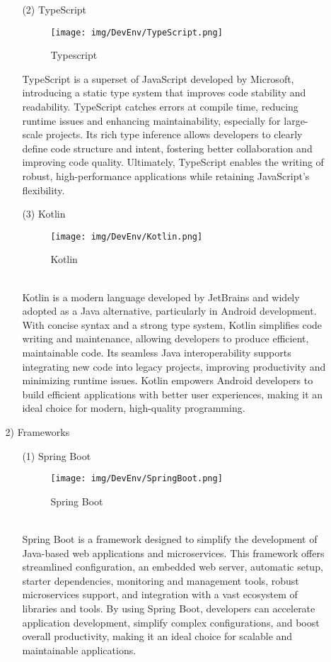 \documentclass[conference]{IEEEtran}
\begin{document}
\begin{enumerate}
\begin{itemize}
\begin{itemize}
\item [(2)] TypeScript\cite{Typescript}
\begin{figure}[h]
\centering
\texttt{[image: img/DevEnv/TypeScript.png]}
\centering
\caption{Typescript} 
\end{figure}
TypeScript is a superset of JavaScript developed by Microsoft, introducing a static type system that improves code stability and readability. TypeScript catches errors at compile time, reducing runtime issues and enhancing maintainability, especially for large-scale projects. Its rich type inference allows developers to clearly define code structure and intent, fostering better collaboration and improving code quality. Ultimately, TypeScript enables the writing of robust, high-performance applications while retaining JavaScript’s flexibility.\\

\item [(3)] Kotlin\cite{Kotlin}
\begin{figure}[h]
\centering
\texttt{[image: img/DevEnv/Kotlin.png]}\centering
\caption{Kotlin} 
\end{figure}\\
Kotlin is a modern language developed by JetBrains and widely adopted as a Java alternative, particularly in Android development. With concise syntax and a strong type system, Kotlin simplifies code writing and maintenance, allowing developers to produce efficient, maintainable code. Its seamless Java interoperability supports integrating new code into legacy projects, improving productivity and minimizing runtime issues. Kotlin empowers Android developers to build efficient applications with better user experiences, making it an ideal choice for modern, high-quality programming.\\

\end{itemize}
\item [2)] Frameworks
\begin{itemize}
\item [(1)] Spring Boot\cite{SpringBoot}
\begin{figure}[h]
\centering
\texttt{[image: img/DevEnv/SpringBoot.png]}
\caption{Spring Boot} 
\end{figure}\\
Spring Boot is a framework designed to simplify the development of Java-based web applications and microservices. This framework offers streamlined configuration, an embedded web server, automatic setup, starter dependencies, monitoring and management tools, robust microservices support, and integration with a vast ecosystem of libraries and tools. By using Spring Boot, developers can accelerate application development, simplify complex configurations, and boost overall productivity, making it an ideal choice for scalable and maintainable applications.\\


\end{itemize}
\end{itemize}
\end{enumerate}
\end{document}
